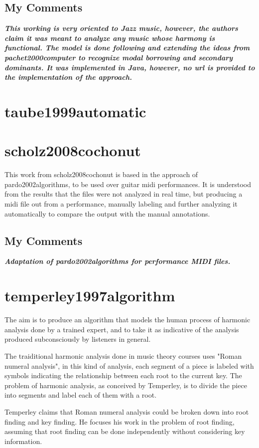 		\subsection{My Comments}
		\emph{\textbf{
			This working is very oriented to Jazz music, however, the authors claim it was meant to analyze any music whose harmony is functional. The model is done following and extending the ideas from pachet2000computer to recognize modal borrowing and secondary dominants. It was implemented in Java, however, no url is provided to the implementation of the approach.
		}}
	\section{taube1999automatic }
	\section{scholz2008cochonut }
		This work from scholz2008cochonut is based in the approach of pardo2002algorithms, to be used over guitar midi performances. It is understood from the results that the files were not analyzed in real time, but producing a midi file out from a performance, manually labeling and further analyzing it automatically to compare the output with the manual annotations.
		\subsection{My Comments}
		\emph{\textbf{
			Adaptation of pardo2002algorithms for performance MIDI files.
		}}
	\section{temperley1997algorithm }
		The aim is to produce an algorithm that models the human process of harmonic analysis done by a trained expert, and to take it as indicative of the analysis produced subconsciously by listeners in general.

		The traiditional harmonic analysis done in music theory courses uses "Roman numeral analysis", in this kind of analysis, each segment of a piece is labeled with symbols indicating the relationship between each root to the current key. The problem of harmonic analysis, as conceived by Temperley, is to divide the piece into segments and label each of them with a root.

		Temperley claims that Roman numeral analysis could be broken down into root finding and key finding. He focuses his work in the problem of root finding, assuming that root finding can be done independently without considering key information.

